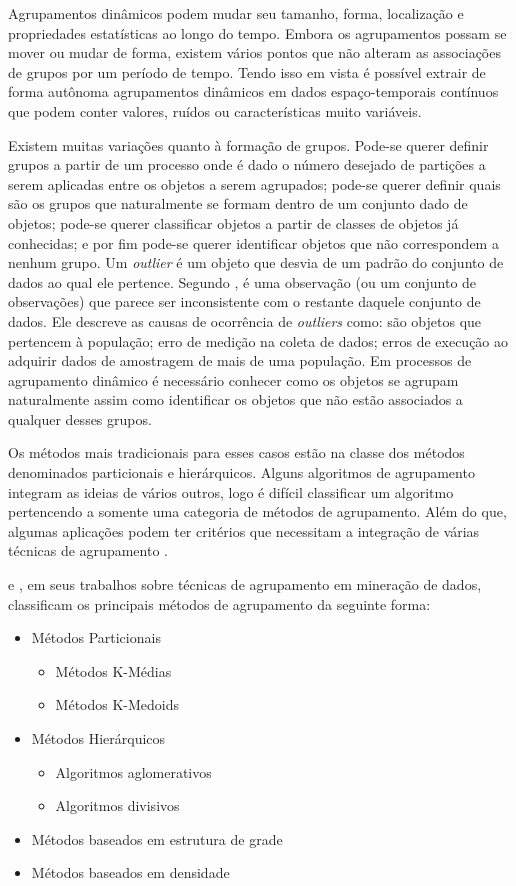 Agrupamentos dinâmicos podem mudar seu tamanho, forma, localização e propriedades estatísticas ao longo do tempo. Embora os agrupamentos possam se mover ou mudar de forma, existem vários pontos que não alteram as associações de grupos por um período de tempo. Tendo isso em vista é possível extrair de forma autônoma agrupamentos dinâmicos em dados espaço-temporais contínuos que podem conter valores, ruídos ou características muito variáveis.

Existem muitas variações quanto à formação de grupos. Pode-se querer definir grupos a partir de um processo onde é dado o número desejado de partições a serem aplicadas entre os objetos a serem agrupados; pode-se querer definir quais são os grupos que naturalmente se formam dentro de um conjunto dado de objetos; pode-se querer classificar objetos a partir de classes de objetos já conhecidas; e por fim pode-se querer identificar objetos que não correspondem a nenhum grupo.
Um \textit{outlier} é um objeto que desvia de um padrão do conjunto de dados ao qual ele pertence. Segundo , é uma observação (ou um conjunto de observações) que parece ser inconsistente com o restante daquele conjunto de dados. Ele descreve as causas de ocorrência de \textit{outliers} como: são objetos que pertencem à população; erro de medição na coleta de dados; erros de execução ao adquirir dados de amostragem de mais de uma população.
Em processos de agrupamento dinâmico é necessário conhecer como os objetos se agrupam naturalmente assim como identificar os objetos que não estão associados a qualquer desses grupos.

Os métodos mais tradicionais para esses casos estão na classe dos métodos denominados particionais e hierárquicos. Alguns algoritmos de agrupamento integram as ideias de vários outros, logo é difícil classificar um algoritmo pertencendo a somente uma categoria de métodos de agrupamento. Além do que, algumas aplicações podem ter critérios que necessitam a integração de várias técnicas de agrupamento \cite{Atluri:2018}.

 e , em seus trabalhos sobre técnicas de agrupamento em mineração de dados, classificam os principais métodos de agrupamento da seguinte forma:
\begin{itemize}
	\item Métodos Particionais
	\begin{itemize}
      \item Métodos K-Médias
      \item Métodos K-Medoids
    \end{itemize}
	\item Métodos Hierárquicos
	\begin{itemize}
      \item Algoritmos aglomerativos
      \item Algoritmos divisivos
    \end{itemize}
	\item Métodos baseados em estrutura de grade
	\item Métodos baseados em densidade
\end{itemize}


